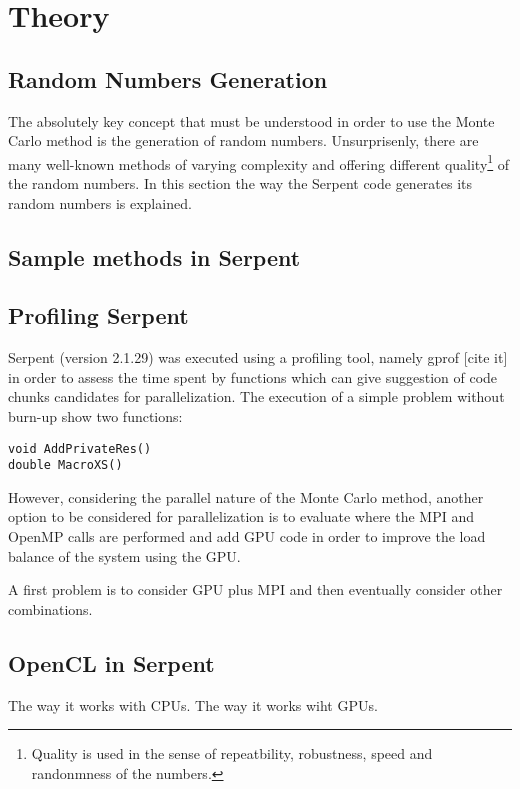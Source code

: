 \documentclass[twoside,a4paper,12pt,english,draft]{anstrans}
\begin{document}
\section{Theory}

\subsection{Random Numbers Generation}
The absolutely key concept that must be understood in order to use the Monte Carlo method is
the generation of random numbers. Unsurprisenly, there are many well-known methods of varying
complexity and offering different quality\footnote{Quality is used in the sense of
  repeatbility, robustness, speed and randonmness of the numbers.} of the random numbers.
In this section the way the Serpent code generates its random numbers is explained.

\subsection{Sample methods in Serpent}

\subsection{Profiling Serpent}

Serpent (version 2.1.29) was executed using a profiling tool, namely gprof [cite it] in order
to assess the time spent by functions which can give suggestion of code chunks candidates for
parallelization. The execution of a simple problem without burn-up show two functions:
\begin{verbatim}
void AddPrivateRes()
double MacroXS()
\end{verbatim}
However, considering the parallel nature of the Monte Carlo method, another option to be considered
for parallelization is to evaluate where the MPI and OpenMP calls are performed and add GPU code
in order to improve the load balance of the system using the GPU.

A first problem is to consider GPU plus MPI and then eventually consider other combinations.


\subsection{OpenCL in Serpent}

The way it works with CPUs.
The way it works wiht GPUs.
\end{document}
